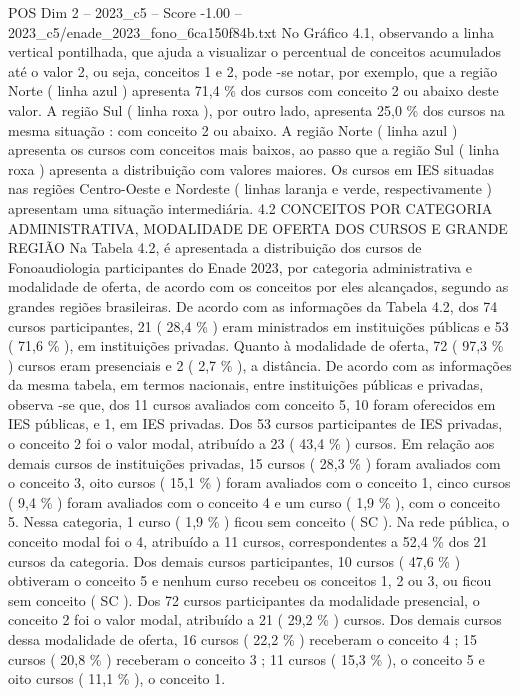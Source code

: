 \begin{textsample}{POS Dim 2 – 2023\_c5 – Score -1.00 – 2023\_c5/enade\_2023\_fono\_6ca150f84b.txt}
No Gráfico 4.1, observando a linha vertical pontilhada, que ajuda a visualizar o percentual de conceitos acumulados até o valor 2, ou seja, conceitos 1 e 2, pode -se notar, por exemplo, que a região Norte ( linha azul ) apresenta 71,4 \% dos cursos com conceito 2 ou abaixo deste valor.
A região Sul ( linha roxa ), por outro lado, apresenta 25,0 \% dos cursos na mesma situação : com conceito 2 ou abaixo.
A região Norte ( linha azul ) apresenta os cursos com conceitos mais baixos, ao passo que a região Sul ( linha roxa ) apresenta a distribuição com valores maiores.
Os cursos em IES situadas nas regiões Centro-Oeste e Nordeste ( linhas laranja e verde, respectivamente ) apresentam uma situação intermediária. 4.2 CONCEITOS POR CATEGORIA ADMINISTRATIVA, MODALIDADE DE OFERTA DOS CURSOS E GRANDE REGIÃO Na Tabela 4.2, é apresentada a distribuição dos cursos de Fonoaudiologia participantes do Enade 2023, por categoria administrativa e modalidade de oferta, de acordo com os conceitos por eles alcançados, segundo as grandes regiões brasileiras.
De acordo com as informações da Tabela 4.2, dos 74 cursos participantes, 21 ( 28,4 \% ) eram ministrados em instituições públicas e 53 ( 71,6 \% ), em instituições privadas.
Quanto à modalidade de oferta, 72 ( 97,3 \% ) cursos eram presenciais e 2 ( 2,7 \% ), a distância.
De acordo com as informações da mesma tabela, em termos nacionais, entre instituições públicas e privadas, observa -se que, dos 11 cursos avaliados com conceito 5, 10 foram oferecidos em IES públicas, e 1, em IES privadas.
Dos 53 cursos participantes de IES privadas, o conceito 2 foi o valor modal, atribuído a 23 ( 43,4 \% ) cursos.
Em relação aos demais cursos de instituições privadas, 15 cursos ( 28,3 \% ) foram avaliados com o conceito 3, oito cursos ( 15,1 \% ) foram avaliados com o conceito 1, cinco cursos ( 9,4 \% ) foram avaliados com o conceito 4 e um curso ( 1,9 \% ), com o conceito 5.
Nessa categoria, 1 curso ( 1,9 \% ) ficou sem conceito ( SC ).
Na rede pública, o conceito modal foi o 4, atribuído a 11 cursos, correspondentes a 52,4 \% dos 21 cursos da categoria.
Dos demais cursos participantes, 10 cursos ( 47,6 \% ) obtiveram o conceito 5 e nenhum curso recebeu os conceitos 1, 2 ou 3, ou ficou sem conceito ( SC ).
Dos 72 cursos participantes da modalidade presencial, o conceito 2 foi o valor modal, atribuído a 21 ( 29,2 \% ) cursos.
Dos demais cursos dessa modalidade de oferta, 16 cursos ( 22,2 \% ) receberam o conceito 4 ; 15 cursos ( 20,8 \% ) receberam o conceito 3 ; 11 cursos ( 15,3 \% ), o conceito 5 e oito cursos ( 11,1 \% ), o conceito 1.

\end{textsample}
